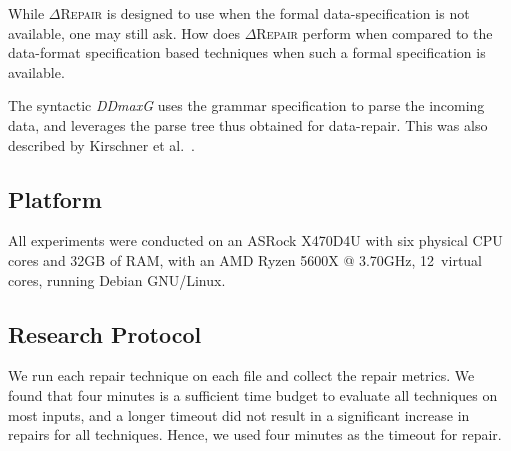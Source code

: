 \documentclass[acmsmall,screen,review,anonymous]{acmart}
\newcommand{\formatdependent}{format-dependent\xspace}
\newcommand{\Formatdependent}{Format-dependent\xspace}
\newcommand{\dtask}{data repair\xspace}
\newcommand{\approach}{\textsc{$\Delta$Repair}\xspace}
\newcommand{\ddmax}{\textit{DDMax}\xspace}
\newcommand{\ddmaxg}{\textit{DDmaxG}\xspace}
\newcommand{\drepair}{\approach}
\begin{document}
\noindent{\textbf{\Formatdependent}.}
While \drepair is designed to use when the formal data-specification is not
available, one may still ask. How does \drepair perform when compared to the
data-format specification based techniques when such a formal specification
is available.

\begin{description}[wide]

\item[\textbf{(2) Syntactic \ddmax:}] The syntactic \ddmaxg uses the
  grammar specification to parse the incoming data, and leverages the parse
  tree thus obtained for data-repair.
  This was also described by Kirschner et al.~\cite{kirschner2020debugging}.
\end{description}

\subsection{Platform}
All experiments were conducted
on an ASRock X470D4U with six physical CPU cores and 32GB of RAM, with an AMD Ryzen 5600X @ 3.70GHz, 12~virtual cores, running Debian GNU/Linux.


\subsection{Research Protocol}
We run each repair technique on each file and collect the repair metrics.
We found that four minutes is a sufficient time budget to evaluate all
techniques on most inputs, and a longer timeout did not result in a
significant increase in repairs for all techniques. Hence, we used four
minutes as the timeout for repair.
\end{document}
